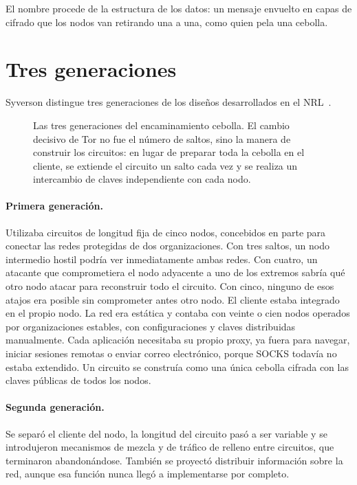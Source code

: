 El nombre procede de la estructura de los datos: un mensaje envuelto en capas de cifrado que los nodos van retirando una a una, como quien pela una cebolla.

\section{Tres generaciones}\label{sec:nascita-generazioni}

Syverson distingue tres generaciones de los diseños desarrollados en el NRL~\cite{syverson2011peel}.

\begin{figure}[htbp]
\centering

\caption{Las tres generaciones del encaminamiento cebolla. El cambio decisivo de Tor no fue el número de saltos, sino la manera de construir los circuitos: en lugar de preparar toda la cebolla en el cliente, se extiende el circuito un salto cada vez y se realiza un intercambio de claves independiente con cada nodo.}
\label{fig:generazioni}
\end{figure}

\paragraph{Primera generación.} Utilizaba circuitos de longitud fija de cinco nodos, concebidos en parte para conectar las redes protegidas de dos organizaciones. Con tres saltos, un nodo intermedio hostil podría ver inmediatamente ambas redes. Con cuatro, un atacante que comprometiera el nodo adyacente a uno de los extremos sabría qué otro nodo atacar para reconstruir todo el circuito. Con cinco, ninguno de esos atajos era posible sin comprometer antes otro nodo. El cliente estaba integrado en el propio nodo. La red era estática y contaba con veinte o cien nodos operados por organizaciones estables, con configuraciones y claves distribuidas manualmente. Cada aplicación necesitaba su propio proxy, ya fuera para navegar, iniciar sesiones remotas o enviar correo electrónico, porque SOCKS todavía no estaba extendido. Un circuito se construía como una única cebolla cifrada con las claves públicas de todos los nodos.

\paragraph{Segunda generación.} Se separó el cliente del nodo, la longitud del circuito pasó a ser variable y se introdujeron mecanismos de mezcla y de tráfico de relleno entre circuitos, que terminaron abandonándose. También se proyectó distribuir información sobre la red, aunque esa función nunca llegó a implementarse por completo.

